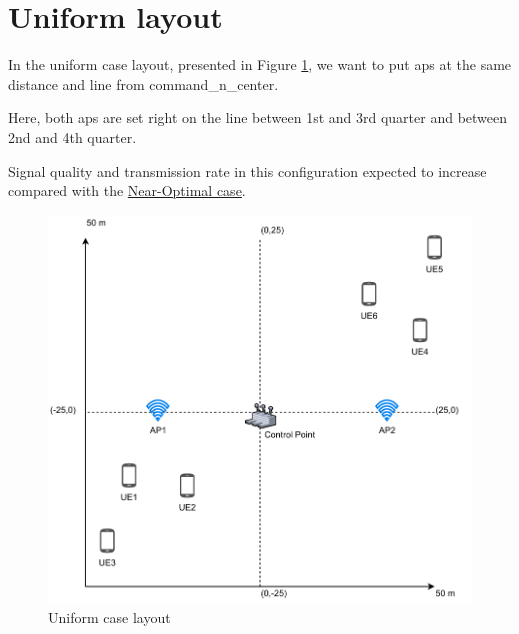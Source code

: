 \section{Uniform layout}\label{uniform-layout}

In the uniform case layout, presented in Figure \ref{fig:uniform-case-layout}, we want to put \glspl{ap} at the same distance and line from \gls{command_n_center}.

Here, both \glspl{ap} are set right on the line between 1st and 3rd quarter and between 2nd and 4th quarter.

Signal quality and transmission rate in this configuration expected to increase compared with the \hyperref[near-optimal-layout]{Near-Optimal case}.

\begin{figure}[H]
	\centering
	\includegraphics[width=\linewidth,keepaspectratio]{images/05-cases-description-Uniform.pdf}
\caption{Uniform case layout}
\label{fig:uniform-case-layout}
\end{figure}
